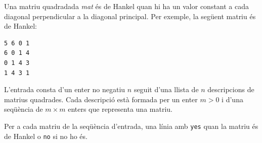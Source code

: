 

\Statement

Una matriu quadradada {\it mat} és de Hankel quan hi ha un valor constant a cada diagonal perpendicular a la diagonal principal. Per exemple, la següent matriu és de Hankel:

\begin{verbatim}
5 6 0 1 
6 0 1 4 
0 1 4 3 
1 4 3 1 
\end{verbatim}


\Input

L'entrada consta d'un enter no negatiu $n$ seguit d'una llista de $n$ descripcions de matrius quadrades. Cada descripció està formada per un enter $m > 0$ i d'una seqüència de $m \times m$ enters que representa una matriu.

\Output

Per a cada matriu de la seqüència d'entrada, una línia amb {\tt yes} quan la matriu és de Hankel o {\tt no} si no ho és.

\Sample




